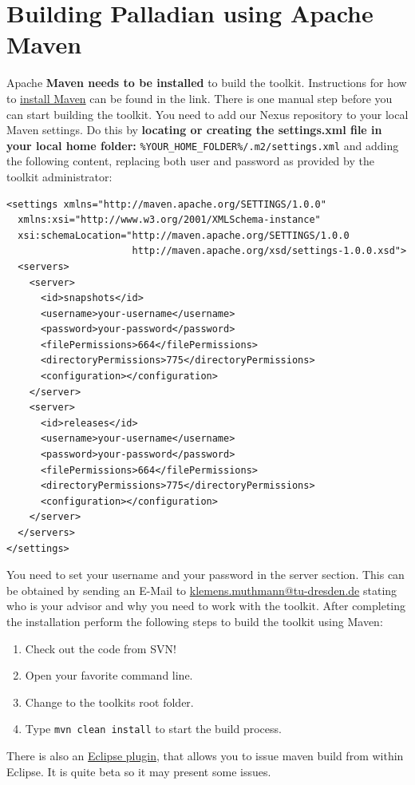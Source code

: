 \documentclass[a4paper,twoside]{book}      %
\begin{document}
\section{Building Palladian using Apache Maven}
\label{sec:buildingthetoolkitusingapachemaven}
Apache \textbf{Maven needs to be installed} to build the toolkit. Instructions for how to \href{http://maven.apache.org/download.html#Installation}{install Maven} can be found in the link. There is one manual step before you can start building the toolkit. You need to add our Nexus repository to your local Maven settings. Do this by \textbf{locating or creating the settings.xml file in your local home folder:} \texttt{\%YOUR\_HOME\_FOLDER\%/.m2/settings.xml} and adding the following content, replacing both user and password as provided by the toolkit administrator:
\begin{verbatim}
<settings xmlns="http://maven.apache.org/SETTINGS/1.0.0"
  xmlns:xsi="http://www.w3.org/2001/XMLSchema-instance"
  xsi:schemaLocation="http://maven.apache.org/SETTINGS/1.0.0
                      http://maven.apache.org/xsd/settings-1.0.0.xsd">
  <servers>
    <server>
      <id>snapshots</id>
      <username>your-username</username>
      <password>your-password</password>
      <filePermissions>664</filePermissions>
      <directoryPermissions>775</directoryPermissions>
      <configuration></configuration>
    </server>
    <server>
      <id>releases</id>
      <username>your-username</username>
      <password>your-password</password>
      <filePermissions>664</filePermissions>
      <directoryPermissions>775</directoryPermissions>
      <configuration></configuration>
    </server>
  </servers>
</settings>
\end{verbatim}
You need to set your username and your password in the server section. This can be obtained by sending an E-Mail to \href{mailto:klemens.muthmann@tu-dresden.de}{klemens.muthmann@tu-dresden.de} stating who is your advisor and why you need to work with the toolkit. After completing the installation perform the following steps to build the toolkit using Maven:
\begin{enumerate}
\item Check out the code from SVN!
\item Open your favorite command line.
\item Change to the toolkits root folder.
\item Type \texttt{mvn clean install} to start the build process.
\end{enumerate}
There is also an \href{http://m2eclipse.sonatype.org/}{Eclipse plugin}, that allows you to issue maven build from within Eclipse. It is quite beta so it may present some issues.
\end{document}
